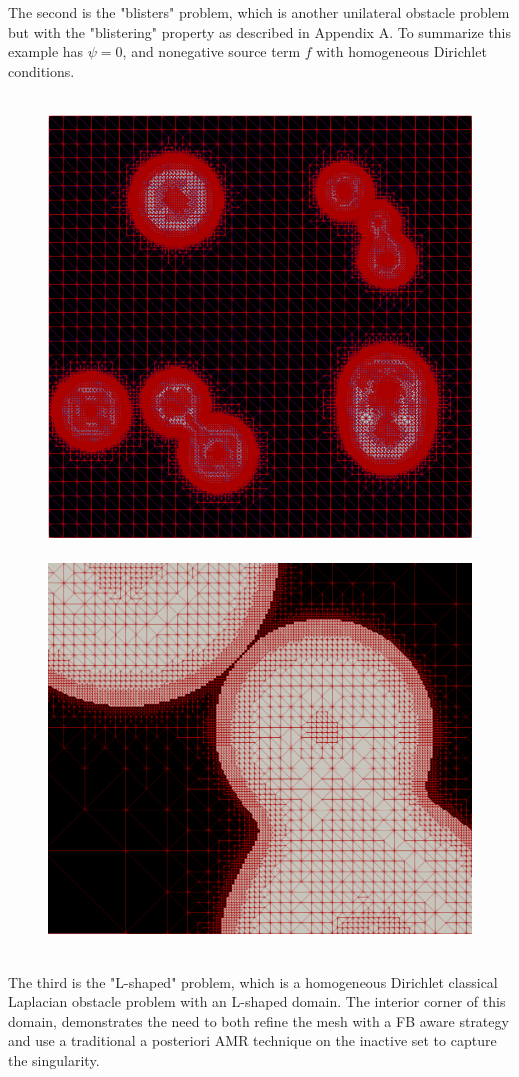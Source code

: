 \documentclass[]{interact}
\theoremstyle{plain}%
\theoremstyle{definition}
\theoremstyle{remark}
\begin{document}
The second is the "blisters" problem, which is another unilateral obstacle problem but with the "blistering" property as described in Appendix A. To summarize this example has $\psi = 0$, and nonegative source term $f$ with homogeneous Dirichlet conditions. 



\begin{figure}[ht]
\centering
\mbox{
\includegraphics[width = .50\textwidth]{meshfigs/blisters.png}\quad\quad
\includegraphics[width = .50\textwidth]{meshfigs/blisterszoomed.png}
}
\caption{}
\label{fig:blistersmeshfig}
\end{figure}





The third is the "L-shaped" problem, which is a homogeneous Dirichlet classical Laplacian obstacle problem with an L-shaped domain. The interior corner of this domain, demonstrates the need to both refine the mesh with a FB aware strategy and use a traditional a posteriori AMR technique on the inactive set to capture the singularity. 
\end{document}

